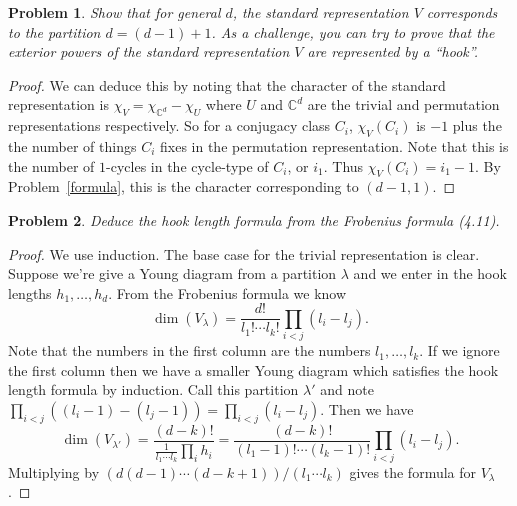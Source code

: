 \documentclass{article}
\newtheorem{problem}{Problem}
\begin{document}
\begin{problem}
\label{standard}
Show that for general $d$, the standard representation $V$ corresponds to the partition $d = (d-1) + 1$. As a challenge, you can try to prove that the exterior powers of the standard representation $V$ are represented by a ``hook''.
\end{problem}
\begin{proof}
We can deduce this by noting that the character of the standard representation is $\chi_V = \chi_{\mathbb{C}^d} - \chi_U$ where $U$ and $\mathbb{C}^d$ are the trivial and permutation representations respectively. So for a conjugacy class $C_i$, $\chi_V(C_i)$ is $-1$ plus the the number of things $C_i$ fixes in the permutation representation. Note that this is the number of $1$-cycles in the cycle-type of $C_i$, or $i_1$. Thus $\chi_V(C_i) = i_1 - 1$. By Problem~\ref{formula}, this is the character corresponding to $(d-1,1)$.
\end{proof}

\begin{problem}
Deduce the hook length formula from the Frobenius formula (4.11).
\end{problem}
\begin{proof}
We use induction. The base case for the trivial representation is clear. Suppose we're give a Young diagram from a partition $\lambda$ and we enter in the hook lengths $h_1, \dots , h_d$. From the Frobenius formula we know
\[
\dim (V_{\lambda}) = \frac{d!}{l_1! \cdots l_k!} \prod_{i<j}(l_i - l_j).
\]
Note that the numbers in the first column are the numbers $l_1, \dots , l_k$. If we ignore the first column then we have a smaller Young diagram which satisfies the hook length formula by induction. Call this partition $\lambda'$ and note $\prod_{i < j}((l_i - 1) - (l_j - 1)) = \prod_{i < j} (l_i - l_j)$. Then we have
\[
\dim (V_{\lambda'}) = \frac{(d-k)!}{\frac{1}{l_1 \cdots l_k} \prod_i h_i} = \frac{(d-k)!}{(l_1-1)! \cdots (l_k-1)!} \prod_{i < j} (l_i - l_j).
\]
Multiplying by $(d(d-1) \cdots (d-k+1))/(l_1 \cdots l_k)$ gives the formula for $V_{\lambda}$.
\end{proof}
\end{document}
